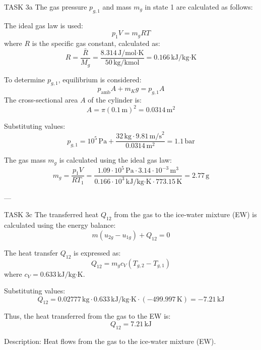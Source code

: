 TASK 3a  
The gas pressure \( p_{g,1} \) and mass \( m_g \) in state 1 are calculated as follows:  

The ideal gas law is used:  
\[
p_1 V = m_g R T
\]  
where \( R \) is the specific gas constant, calculated as:  
\[
R = \frac{\bar{R}}{M_g} = \frac{8.314 \, \text{J/mol·K}}{50 \, \text{kg/kmol}} = 0.166 \, \text{kJ/kg·K}
\]  

To determine \( p_{g,1} \), equilibrium is considered:  
\[
p_{\text{amb}} A + m_K g = p_{g,1} A
\]  
The cross-sectional area \( A \) of the cylinder is:  
\[
A = \pi \left( 0.1 \, \text{m} \right)^2 = 0.0314 \, \text{m}^2
\]  

Substituting values:  
\[
p_{g,1} = 10^5 \, \text{Pa} + \frac{32 \, \text{kg} \cdot 9.81 \, \text{m/s}^2}{0.0314 \, \text{m}^2} = 1.1 \, \text{bar}
\]  

The gas mass \( m_g \) is calculated using the ideal gas law:  
\[
m_g = \frac{p_1 V}{R T_1} = \frac{1.09 \cdot 10^5 \, \text{Pa} \cdot 3.14 \cdot 10^{-3} \, \text{m}^3}{0.166 \cdot 10^3 \, \text{kJ/kg·K} \cdot 773.15 \, \text{K}} = 2.77 \, \text{g}
\]  

---

TASK 3c  
The transferred heat \( Q_{12} \) from the gas to the ice-water mixture (EW) is calculated using the energy balance:  
\[
m \left( u_{2g} - u_{1g} \right) + Q_{12} = 0
\]  

The heat transfer \( Q_{12} \) is expressed as:  
\[
Q_{12} = m_g c_V \left( T_{g,2} - T_{g,1} \right)
\]  
where \( c_V = 0.633 \, \text{kJ/kg·K} \).  

Substituting values:  
\[
Q_{12} = 0.02777 \, \text{kg} \cdot 0.633 \, \text{kJ/kg·K} \cdot \left( -499.997 \, \text{K} \right) = -7.21 \, \text{kJ}
\]  

Thus, the heat transferred from the gas to the EW is:  
\[
Q_{12} = 7.21 \, \text{kJ}
\]  

Description: Heat flows from the gas to the ice-water mixture (EW).